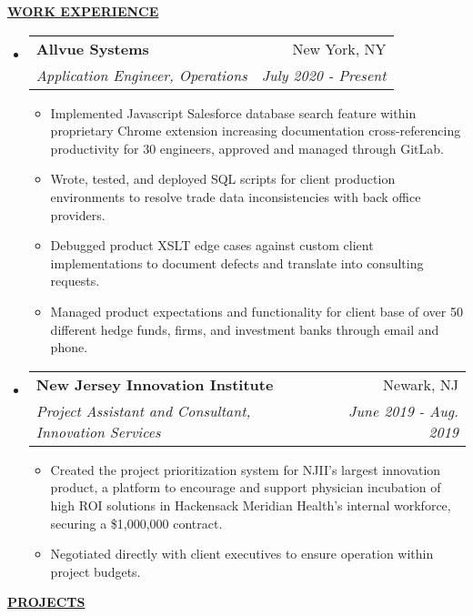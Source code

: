 \documentclass[letterpaper,11pt]{article}
\makeatletter
\newcommand{\resheading}[1]{{{\begin{minipage}{\textwidth}{\textbf{#1 \vphantom{p\^{E}}}}\end{minipage}}}}
\newcommand{\ressubheading}[4]{
\begin{tabular*}{7.3in}{l@{\extracolsep{\fill}}r}
		\textbf{#1} & #2 \\
		\textit{#3} & \textit{#4} \\
\end{tabular*}}
\makeatother
\begin{document}
\resheading{\hspace{0em}\uline{\textsc{WORK EXPERIENCE}\hfill}}
\vspace{-0.15in}
\begin{itemize}[leftmargin=*]
\item
	\ressubheading{Allvue Systems}{New York, NY}{Application Engineer, Operations}{July 2020 - Present}
	\vspace{-0.1in}
	\begin{itemize}[leftmargin=*]
	\setlength\itemsep{0em}
		\item{Implemented Javascript Salesforce database search feature within proprietary Chrome extension increasing documentation cross-referencing productivity for 30 engineers, approved and managed through GitLab.}
		\item{Wrote, tested, and deployed SQL scripts for client production environments to resolve trade data inconsistencies with back office providers.}
		\item{Debugged product XSLT edge cases against custom client implementations to document defects and translate into consulting requests.}
		\item{Managed product expectations and functionality for client base of over 50 different hedge funds, firms, and investment banks through email and phone.}
	\end{itemize}

\item
	\ressubheading{New Jersey Innovation Institute}{Newark, NJ}{Project Assistant and Consultant, Innovation Services}{June 2019 - Aug. 2019}
	\vspace{-0.1in}
	\begin{itemize}[leftmargin=*]
	\setlength\itemsep{0em}
		\item{Created the project prioritization system for NJII's largest innovation product, a platform to encourage and support physician incubation of high ROI solutions in Hackensack Meridian Health’s internal workforce, securing a \$1,000,000 contract.}
		\item{Negotiated directly with client executives to ensure operation within project budgets.}
		
	\end{itemize}

\end{itemize}

\resheading{\hspace{0em}\uline{\textsc{PROJECTS}\hfill}}
\vspace{-0.15in}
\end{document}
